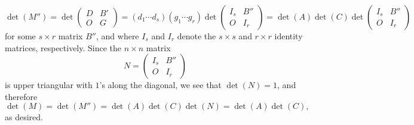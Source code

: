 \documentclass[12pt]{article}
\begin{document}
\begin{enumerate}
\begin{equation*}
\det(M'') = \det\begin{pmatrix}
D & B' \\
O & G
\end{pmatrix}
= (d_1 \cdots d_s)(g_1 \cdots g_r) \det\begin{pmatrix}
I_s & B'' \\
O & I_r
\end{pmatrix}
= \det(A) \det(C) \det\begin{pmatrix}
I_s & B'' \\
O & I_r
\end{pmatrix}
\end{equation*}
for some $s \times r$ matrix $B''$, and where $I_s$ and $I_r$ denote the $s \times s$ and $r \times r$ identity matrices, respectively. Since the $n \times n$ matrix
\begin{equation*}
N = \begin{pmatrix}
I_s & B'' \\
O & I_r
\end{pmatrix}
\end{equation*}
is upper triangular with $1$'s along the diagonal, we see that $\det(N) = 1$, and therefore
\begin{equation*}
\det(M) = \det(M'') = \det(A) \det(C) \det(N) = \det(A) \det(C),
\end{equation*}
as desired.

\end{enumerate}
\end{document}
